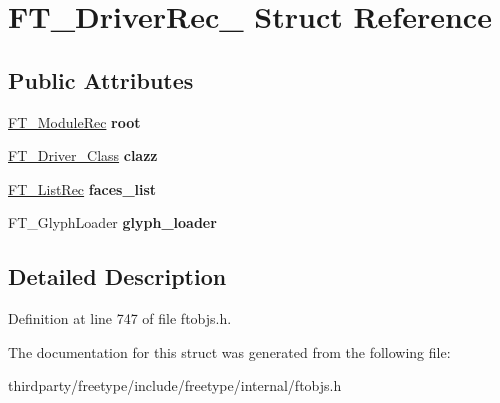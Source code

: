 \hypertarget{struct_f_t___driver_rec__}{}\section{F\+T\+\_\+\+Driver\+Rec\+\_\+ Struct Reference}
\label{struct_f_t___driver_rec__}
\subsection*{Public Attributes}
\begin{DoxyCompactItemize}
\item 
\mbox{\label{struct_f_t___driver_rec___a8451ceb25c76794fb47e81f477c8222d}} 
\hyperlink{struct_f_t___module_rec__}{F\+T\+\_\+\+Module\+Rec} {\bfseries root}
\item 
\mbox{\label{struct_f_t___driver_rec___a3111153608e5abeb093ed5eb7fef5aec}} 
\hyperlink{struct_f_t___driver___class_rec__}{F\+T\+\_\+\+Driver\+\_\+\+Class} {\bfseries clazz}
\item 
\mbox{\label{struct_f_t___driver_rec___a2602170e3ecde21a764dc32417aaa002}} 
\hyperlink{struct_f_t___list_rec__}{F\+T\+\_\+\+List\+Rec} {\bfseries faces\+\_\+list}
\item 
\mbox{\label{struct_f_t___driver_rec___ac28e7adbc14ee82c2b7710d0ee5541e2}} 
F\+T\+\_\+\+Glyph\+Loader {\bfseries glyph\+\_\+loader}
\end{DoxyCompactItemize}


\subsection{Detailed Description}


Definition at line 747 of file ftobjs.\+h.



The documentation for this struct was generated from the following file\+:\begin{DoxyCompactItemize}
\item 
thirdparty/freetype/include/freetype/internal/ftobjs.\+h\end{DoxyCompactItemize}
